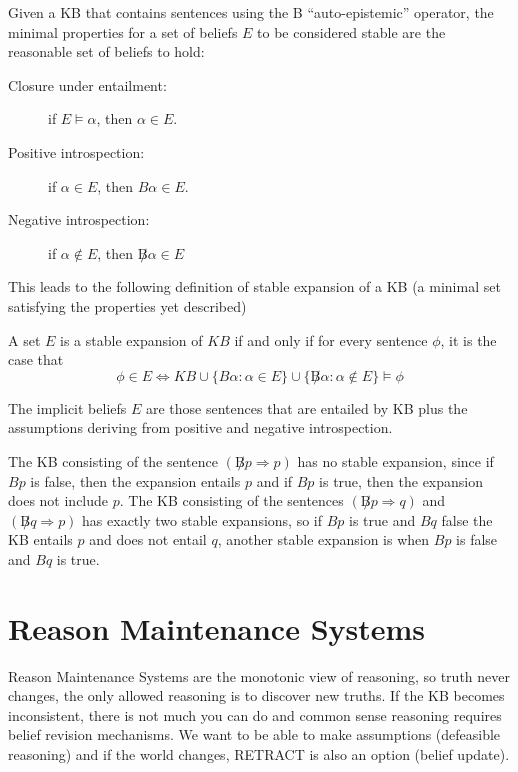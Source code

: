 Given a KB that contains sentences using the B “auto-epistemic” operator, the 
minimal properties for a set of beliefs $E$ to be considered stable are the reasonable
set of beliefs to hold:
\begin{description}
 \item [Closure under entailment: ] if $E \models \alpha$, then $\alpha \in E$.
 \item [Positive introspection: ] if $\alpha \in E$, then $B \alpha \in E$.
 \item [Negative introspection: ] if $\alpha \not \in E$, then $\not B \alpha \in E$
\end{description}
This leads to the following definition of stable expansion of a KB
(a minimal set satisfying the properties yet described)
\begin{defi}
  A set $E$ is a stable expansion of $KB$ if and only if for every sentence $\phi$,
  it is the case that
  \[ \phi \in E \iff KB \cup \{B\alpha : \alpha \in E\} \cup 
                     \{\not B \alpha : \alpha \not \in E\} \models \phi \]
\end{defi}
The implicit beliefs $E$ are those sentences that are entailed by KB plus the 
assumptions deriving from positive and negative introspection.

The KB consisting of the sentence $(\not B p \Rightarrow p)$ has no stable expansion,
since if $B p$ is false, then the expansion entails $p$ and if $B p$ is true, then the
expansion does not include $p$.\newline
The KB consisting of the sentences $(\not B p \Rightarrow q)$ and $(\not B q \Rightarrow p)$
has exactly two stable expansions, so if $B p$ is true and $B q$ false the KB entails
$p$ and does not entail $q$, another stable expansion is when $B p$ is false and 
$B q$ is true.

\section{Reason Maintenance Systems}
Reason Maintenance Systems are the monotonic view of reasoning, so truth never changes,
the only allowed reasoning is to discover new truths.\newline
If the KB becomes inconsistent, there is not much you can do and common sense
reasoning requires belief revision mechanisms.\newline
We want to be able to make assumptions (defeasible reasoning) and if the world changes,
RETRACT is also an option (belief update).

